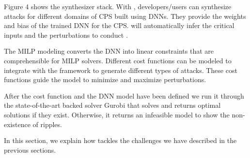 Figure 4 shows the \tool synthesizer stack. With \tool, developers/users can synthesize attacks for different domains of CPS built using DNNs. They provide the weights and bias of the trained DNN for the CPS. \tool will automatically infer the critical inputs and the perturbations to conduct \attack.

The MILP modeling converts the DNN into linear constraints that are comprehensible for MILP solvers. Different cost functions can be modeled to integrate with the framework to generate different types of attacks. These cost functions guide the model to minimize and maximize \cite{Williams2013} perturbations. %

After the cost function and the DNN model have been defined we run it through the state-of-the-art backed solver Gurobi \cite{gurobi} that solves and returns optimal solutions if they exist. Otherwise, it returns an infeasible model to show the non-existence of ripples.

In this section, we explain how \tool tackles the challenges we have described in the previous sections. %




